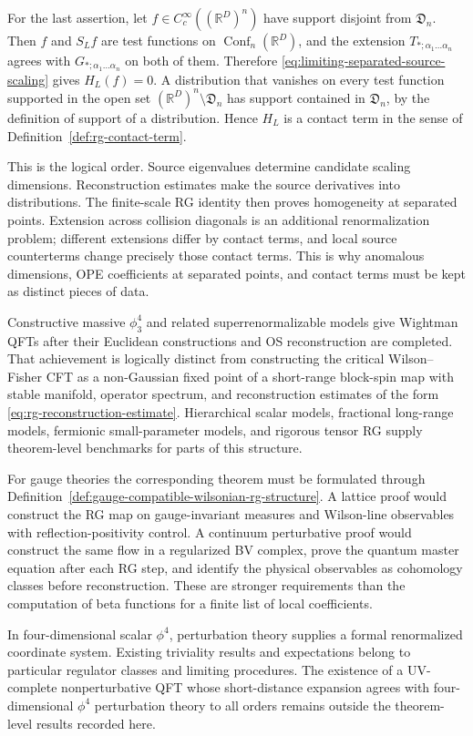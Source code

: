 For the last assertion, let \(f\in
C_c^\infty((\mathbb R^D)^n)\) have support disjoint from
\(\mathfrak D_n\).  Then \(f\) and \(S_Lf\) are test functions on
\(\operatorname{Conf}_n(\mathbb R^D)\), and the extension
\(T_{\ast;\alpha_1\ldots\alpha_n}\) agrees with
\(G_{\ast;\alpha_1\ldots\alpha_n}\) on both of them.  Therefore
\eqref{eq:limiting-separated-source-scaling} gives \(H_L(f)=0\).  A
distribution that vanishes on every test function supported in the open set
\((\mathbb R^D)^n\setminus\mathfrak D_n\) has support contained in
\(\mathfrak D_n\), by the definition of support of a distribution.  Hence
\(H_L\) is a contact term in the sense of
Definition~\ref{def:rg-contact-term}.

This is the logical order.  Source eigenvalues determine
candidate scaling dimensions.  Reconstruction estimates make the source
derivatives into distributions.  The finite-scale RG identity then proves
homogeneity at separated points.  Extension across collision diagonals is an
additional renormalization problem; different extensions differ by contact
terms, and local source counterterms change precisely those contact terms.
This is why anomalous dimensions, OPE coefficients at separated points, and
contact terms must be kept as distinct pieces of data.

\begin{remark}
\label{rem:short-range-scalar-gauge-rg-status}
Constructive massive \(\phi^4_3\) and related superrenormalizable models give
Wightman QFTs after their Euclidean constructions and OS reconstruction are
completed.  That achievement is logically distinct from constructing the
critical Wilson--Fisher CFT as a non-Gaussian fixed point of a short-range
block-spin map with stable manifold, operator spectrum, and reconstruction
estimates of the form
\eqref{eq:rg-reconstruction-estimate}.  Hierarchical scalar models,
fractional long-range models, fermionic small-parameter models, and rigorous
tensor RG supply theorem-level benchmarks for parts of this structure.

For gauge theories the corresponding theorem must be formulated through
Definition~\ref{def:gauge-compatible-wilsonian-rg-structure}.  A lattice proof
would construct the RG map on gauge-invariant measures and Wilson-line
observables with reflection-positivity control.  A continuum perturbative
proof would construct the same flow in a regularized BV complex, prove the
quantum master equation after each RG step, and identify the physical
observables as cohomology classes before reconstruction.  These are stronger
requirements than the computation of beta functions for a finite list of
local coefficients.

In four-dimensional scalar \(\phi^4\), perturbation theory supplies a formal
renormalized coordinate system.  Existing triviality results and expectations
belong to particular regulator classes and limiting procedures.  The
existence of a UV-complete nonperturbative QFT whose short-distance
expansion agrees with four-dimensional \(\phi^4\) perturbation theory to all
orders remains outside the theorem-level results recorded here.
\end{remark}

